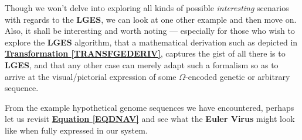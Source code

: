 \documentclass[a4paper, 18pt]{book} %
\begin{document}
Though we won't delve into exploring all kinds of possible \textit{interesting} scenarios with regards to the \textbf{LGES}, we can look at one other example and then move on. Also, it shall be interesting and worth noting --- especially for those who wish to explore the \textbf{LGES} algorithm, that a mathematical derivation such as depicted in \textbf{\hyperref[TRANSFGEDERIV]{Transformation \ref{TRANSFGEDERIV}}}, captures the gist of all there is to \textbf{LGES}, and that any other case can merely adapt such a formalism so as to arrive at the visual/pictorial expression of some $\Omega$-encoded genetic or arbitrary sequence.


From the example hypothetical genome sequences we have encountered, perhaps let us revisit \textbf{\hyperref[EQDNAV]{Equation \ref{EQDNAV}}} and see what the \textbf{Euler Virus} might look like when fully expressed in our system.
\end{document}
